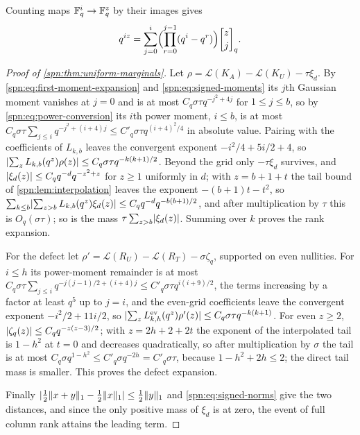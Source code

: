 Counting maps $\mathbb{F}_q^i\to\mathbb{F}_q^z$ by their images gives
\begin{equation}\label{spn:eq:power-conversion}
 q^{iz}=\sum_{j=0}^i\Bigl(\prod_{r=0}^{j-1}(q^i-q^r)\Bigr)\spnqbin zjq .
\end{equation}

\begin{proof}[Proof of \cref{spn:thm:uniform-marginals}]
Let $\rho=\mathcal L(K_A)-\mathcal L(K_U)-\tau\xi_d$. By \eqref{spn:eq:first-moment-expansion} and
\eqref{spn:eq:signed-moments} its $j$th Gaussian moment vanishes at $j=0$ and is at most
$C_q\sigma\tau q^{-j^2+4j}$ for $1\le j\le b$, so by \eqref{spn:eq:power-conversion} its $i$th power
moment, $i\le b$, is at most $C_q\sigma\tau\sum_{j\le i}q^{-j^2+(i+4)j}\le C'_q\sigma\tau q^{(i+4)^2/4}$
in absolute value. Pairing with the coefficients of $L_{k,b}$ leaves the convergent exponent
$-i^2/4+5i/2+4$, so $\lvert\sum_zL_{k,b}(q^z)\rho(z)\rvert\le C_q\sigma\tau q^{-k(k+1)/2}$. Beyond the grid
only $-\tau\xi_d$ survives, and $\lvert\xi_d(z)\rvert\le C_qq^{-d}q^{-z^2+z}$ for $z\ge1$ uniformly in $d$;
with $z=b+1+t$ the tail bound of \cref{spn:lem:interpolation} leaves the exponent $-(b+1)t-t^2$, so
$\sum_{k\le b}\lvert\sum_{z>b}L_{k,b}(q^z)\xi_d(z)\rvert\le C_qq^{-d}q^{-b(b+1)/2}$, and after
multiplication by $\tau$ this is $O_q(\sigma\tau)$; so is the mass $\tau\sum_{z>b}\lvert\xi_d(z)\rvert$.
Summing over $k$ proves the rank expansion.

For the defect let $\rho'=\mathcal L(R_U)-\mathcal L(R_T)-\sigma\zeta_q$, supported on even
nullities. For $i\le h$ its power-moment remainder is at most
$C_q\sigma\tau\sum_{j\le i}q^{-j(j-1)/2+(i+4)j}\le C'_q\sigma\tau q^{i(i+9)/2}$, the terms increasing
by a factor at least $q^5$ up to $j=i$, and the even-grid coefficients leave the convergent exponent
$-i^2/2+11i/2$, so $\lvert\sum_zL^{\mathrm{ev}}_{k,h}(q^z)\rho'(z)\rvert\le C_q\sigma\tau q^{-k(k+1)}$. For
even $z\ge2$, $\lvert\zeta_q(z)\rvert\le C_qq^{-z(z-3)/2}$; with $z=2h+2+2t$ the exponent of the
interpolated tail is $1-h^2$ at $t=0$ and decreases quadratically, so after multiplication by
$\sigma$ the tail is at most $C_q\sigma q^{1-h^2}\le C'_q\sigma q^{-2h}=C'_q\sigma\tau$, because
$1-h^2+2h\le2$; the direct tail mass is smaller. This proves the defect expansion.

Finally $\lvert\frac12\lVert x+y\rVert_1-\frac12\lVert x\rVert_1\rvert\le\frac12\lVert y\rVert_1$ and
\eqref{spn:eq:signed-norms} give the two distances, and since the only positive mass of $\xi_d$ is
at zero, the event of full column rank attains the leading term.
\end{proof}

